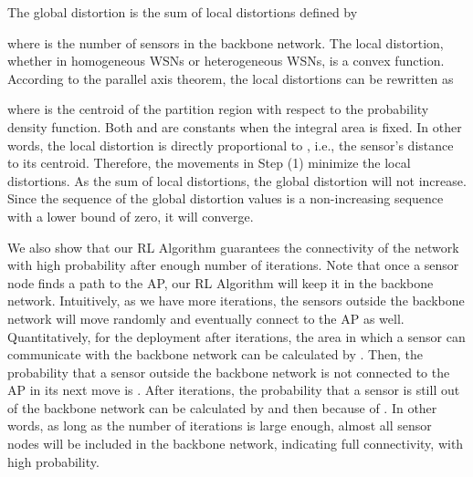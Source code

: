 \documentclass[journal,draftcls,onecolumn,12pt,twoside, narroweqnarray]{IEEEtran}
\begin{document}
The global distortion is the sum of local distortions defined by

where  is the number of sensors in the backbone network.
The local distortion, whether in homogeneous WSNs or heterogeneous WSNs, is a convex function. According to the parallel axis theorem, the local distortions can be rewritten as

where  is the centroid of the partition region  with respect to the probability density function. Both  and  are constants when the integral area  is fixed. In other words, the local distortion is directly proportional to , i.e., the  sensor's distance to its centroid. Therefore, the movements in Step (1) minimize the local distortions. As the sum of local distortions, the global distortion will not increase. Since the sequence of the global distortion values is a non-increasing sequence with a lower bound of zero, it will converge.





We also show that our RL Algorithm guarantees the connectivity of the network with high probability after enough number of iterations.
Note that once a sensor node finds a path to the AP, our RL Algorithm will keep it in the backbone network.
Intuitively, as we have more iterations, the sensors outside the backbone network will move randomly and eventually connect to the AP as well.
Quantitatively, for the deployment after  iterations, the area in which a sensor can communicate with the backbone network can be calculated by  . Then, the probability that a sensor outside the backbone network is not connected to the AP in its next move is .
After  iterations, the probability that a sensor is still out of the backbone network can be calculated by  and then  because of . In other words, as long as the number of iterations is large enough, almost all sensor nodes will be included in the backbone network, indicating full connectivity, with high probability.
\end{document}
